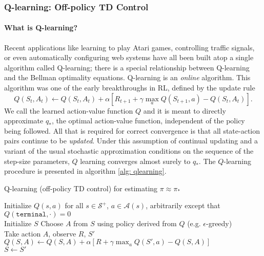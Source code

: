 \documentclass[12pt]{article}
\begin{document}
\subsubsection{Q-learning: Off-policy TD Control}
\paragraph{What is Q-learning?}
Recent applications like learning to play Atari games, controlling traffic signals, or even automatically configuring web systems have all been built atop a single algorithm called Q-learning; there is a special relationship between Q-learning and the Bellman optimality equations. Q-learning is an \emph{online} algorithm. This algorithm was one of the early breakthroughs in RL, defined by the update rule
\begin{equation}
  \label{eq: qlearningupdaterule}
  Q(S_t, A_t) \gets Q(S_t, A_t) + \alpha \left[R_{t+1} + \gamma \max_a Q(S_{t+1}, a) - Q(S_t, A_t)\right].
\end{equation}
We call the learned action-value function $Q$ and it is meant to directly approximate $q_*$, the optimal action-value function, independent of the policy being followed. All that is required for correct convergence is that all state-action pairs continue to be \emph{updated}. Under this assumption of continual updating and a variant of the usual stochastic approximation conditions on the sequence of the step-size parameters, $Q$ learning converges almost surely to $q_*$. The $Q$-learning procedure is presented in algorithm
\ref{alg: qlearning}.
\begin{algorithm}[h]
  \caption{Q-learning (off-policy TD control) for estimating $\pi \approx \pi_*$}
  \KwInput{Step size $\alpha \in (0, 1]$, and a small $\epsilon > 0$.}
  Initialize $Q(s,a)$ for all $s \in \mathcal S^+$, $a \in \mathcal A(s)$,   arbitrarily except that $Q(\texttt{terminal}, \cdot) = 0$ \\
 {
  Initialize $S$
   {
    Choose $A$ from $S$ using policy derived from $Q$ (e.g. $\epsilon$-greedy)     \\
Take action $A$, observe $R$, $S'$ \\
    $Q(S,A) \gets Q(S,A) + \alpha \left[R + \gamma \max_a Q(S', a) -       Q(S,A)\right]$ \\
    $S \gets S'$
  }
}
\label{alg: qlearning}
\end{algorithm}
\end{document}

